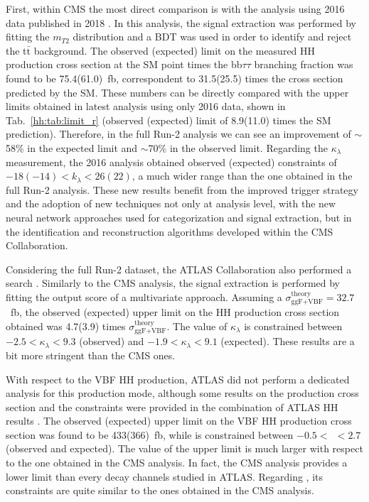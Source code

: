 \documentclass[../main.tex]{subfiles}
\begin{document}
First, within CMS the most direct comparison is with the \hhbbtt{} analysis using 2016 data published in 2018 \cite{hh:analysis:2016}. In this analysis, the signal extraction was performed by fitting the $m_{T2}$ distribution \cite{hh:analysis:mt2} and a BDT was used in order to identify and reject the t$\bar{\text{t}}$ background. The observed (expected) limit on the measured HH production cross section at the SM point times the bb$\tau\tau$ branching fraction was found to be 75.4(61.0)~fb, correspondent to 31.5(25.5) times the cross section predicted by the SM. These numbers can be directly compared with the upper limits obtained in latest analysis using only 2016 data, shown in Tab.~\ref{hh:tab:limit_r} (observed (expected) limit of 8.9(11.0) times the SM prediction). Therefore, in the full Run-2 analysis we can see an improvement of $\sim$58\% in the expected limit and $\sim$70\% in the observed limit. Regarding the $\kappa_\lambda$ measurement, the 2016 analysis obtained observed (expected) constraints of $-18(-14) < k_\lambda < 26(22)$, a much wider range than the one obtained in the full Run-2 analysis. These new results benefit from the improved trigger strategy and the adoption of new techniques not only at analysis level, with the new neural network approaches used for categorization and signal extraction, but in the identification and reconstruction algorithms developed within the CMS Collaboration.

Considering the full Run-2 dataset, the ATLAS Collaboration also performed a \hhbbtt{} search \cite{hh:analysis:atlas, hh:analysis:atlas_comb}. Similarly to the CMS analysis, the signal extraction is performed by fitting the output score of a multivariate approach. Assuming a $\sigma_{\text{ggF+VBF}}^{\text{theory}}=32.7$~fb, the observed (expected) upper limit on the HH production cross section obtained was 4.7(3.9) times $\sigma_{\text{ggF+VBF}}^{\text{theory}}$. The value of $\kappa_\lambda$ is constrained between $-2.5 < \kappa_\lambda < 9.3$ (observed) and $-1.9 < \kappa_\lambda < 9.1$ (expected). These results are a bit more stringent than the CMS ones.

With respect to the VBF HH production, ATLAS did not perform a dedicated analysis for this production mode, although some results on the production cross section and the \kvv{} constraints were provided in the combination of ATLAS HH results \cite{hh:analysis:atlas_comb}. The observed (expected) upper limit on the VBF HH production cross section was found to be 433(366)~fb, while \kvv{} is constrained between $-0.5<~$\kvv{}$~<2.7$ (observed and expected). The value of the upper limit is much larger with respect to the one obtained in the CMS analysis. In fact, the CMS \hhbbtt{} analysis provides a lower limit than every decay channels studied in ATLAS. Regarding \kvv{}, its constraints are quite similar to the ones obtained in the CMS analysis.
\end{document}
